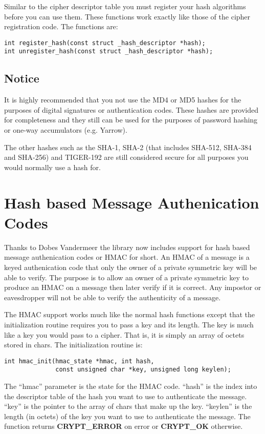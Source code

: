 \documentclass{book}
\begin{document}
Similar to the cipher descriptor table you must register your hash algorithms before you can use them.  These functions
work exactly like those of the cipher registration code.  The functions are:
\begin{verbatim}
int register_hash(const struct _hash_descriptor *hash);
int unregister_hash(const struct _hash_descriptor *hash);
\end{verbatim}

\subsection{Notice}
It is highly recommended that you not use the MD4 or MD5 hashes for the purposes of digital signatures or authentication codes.  
These hashes are provided for completeness and they still can be used for the purposes of password hashing or one-way accumulators
(e.g. Yarrow).

The other hashes such as the SHA-1, SHA-2 (that includes SHA-512, SHA-384 and SHA-256) and TIGER-192 are still considered secure
for all purposes you would normally use a hash for.

\section{Hash based Message Authenication Codes}
Thanks to Dobes Vandermeer the library now includes support for hash based message authenication codes or HMAC for short.  An HMAC
of a message is a keyed authenication code that only the owner of a private symmetric key will be able to verify.  The purpose is
to allow an owner of a private symmetric key to produce an HMAC on a message then later verify if it is correct.  Any impostor or
eavesdropper will not be able to verify the authenticity of a message.  

The HMAC support works much like the normal hash functions except that the initialization routine requires you to pass a key 
and its length.  The key is much like a key you would pass to a cipher.  That is, it is simply an array of octets stored in
chars.  The initialization routine is:
\begin{verbatim}
int hmac_init(hmac_state *hmac, int hash, 
              const unsigned char *key, unsigned long keylen);
\end{verbatim}
The ``hmac'' parameter is the state for the HMAC code.  ``hash'' is the index into the descriptor table of the hash you want
to use to authenticate the message.  ``key'' is the pointer to the array of chars that make up the key.  ``keylen'' is the
length (in octets) of the key you want to use to authenticate the message.  The function returns {\bf CRYPT\_ERROR} on error
or {\bf CRYPT\_OK} otherwise.
\end{document}
